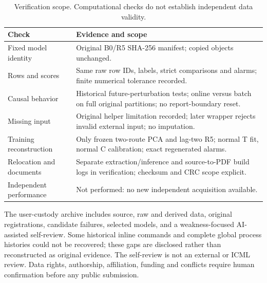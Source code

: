 \documentclass{article}
\begin{document}
\begin{table}[!ht]\centering\caption{Verification scope. Computational checks do not establish independent data validity.}\begin{tabularx}{\textwidth}{lX}\toprule
Check & Evidence and scope\\\midrule
Fixed model identity & Original B0/R5 SHA-256 manifest; copied objects unchanged.\\
Rows and scores & Same raw row IDs, labels, strict comparisons and alarms; finite numerical tolerance recorded.\\
Causal behavior & Historical future-perturbation tests; online versus batch on full original partitions; no report-boundary reset.\\
Missing input & Original helper limitation recorded; later wrapper rejects invalid external input; no imputation.\\
Training reconstruction & Only frozen two-route PCA and lag-two R5; normal T fit, normal C calibration; exact regenerated alarms.\\
Relocation and documents & Separate extraction/inference and source-to-PDF build logs in verification; checksum and CRC scope explicit.\\
Independent performance & Not performed: no new independent acquisition available.\\\bottomrule\end{tabularx}\end{table}
The user-custody archive includes source, raw and derived data, original registrations, candidate failures, selected models, and a weakness-focused AI-assisted self-review. Some historical inline commands and complete global process histories could not be recovered; these gaps are disclosed rather than reconstructed as original evidence. The self-review is not an external or ICML review. Data rights, authorship, affiliation, funding and conflicts require human confirmation before any public submission.
\end{document}
